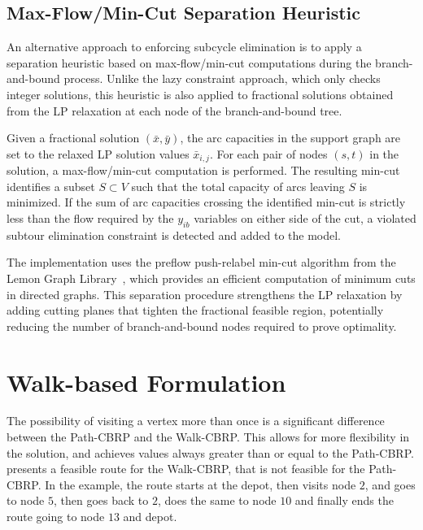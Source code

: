 \subsection{Max-Flow/Min-Cut Separation Heuristic}\label{subsec:max-flow-min-cut-separation-heuristic}

An alternative approach to enforcing subcycle elimination is to apply a separation heuristic based on max-flow/min-cut computations during the branch-and-bound process. Unlike the lazy constraint approach, which only checks integer solutions, this heuristic is also applied to fractional solutions obtained from the LP relaxation at each node of the branch-and-bound tree.

Given a fractional solution $(\bar{x}, \bar{y})$, the arc capacities in the support graph are set to the relaxed LP solution values $\bar{x}_{i,j}$. For each pair of nodes $(s, t)$ in the solution, a max-flow/min-cut computation is performed. The resulting min-cut identifies a subset $S \subset V$ such that the total capacity of arcs leaving $S$ is minimized. If the sum of arc capacities crossing the identified min-cut is strictly less than the flow required by the $y_{ib}$ variables on either side of the cut, a violated subtour elimination constraint is detected and added to the model.

The implementation uses the preflow push-relabel min-cut algorithm from the Lemon Graph Library~\citep{lemon:2011}, which provides an efficient computation of minimum cuts in directed graphs. This separation procedure strengthens the LP relaxation by adding cutting planes that tighten the fractional feasible region, potentially reducing the number of branch-and-bound nodes required to prove optimality.

\section{Walk-based Formulation}\label{sec:cbrp-walk-based-formulation}

The possibility of visiting a vertex more than once is a significant difference
between the Path-CBRP and the Walk-CBRP. This allows for more flexibility in the
solution, and achieves values always greater than or equal to the Path-CBRP.
 presents a feasible route for the
Walk-CBRP, that is not feasible for the Path-CBRP. In the example, the route
starts at the depot, then visits node $2$, and goes to node $5$, then goes back
to $2$, does the same to node $10$ and finally ends the route going to node $13$
and depot.

